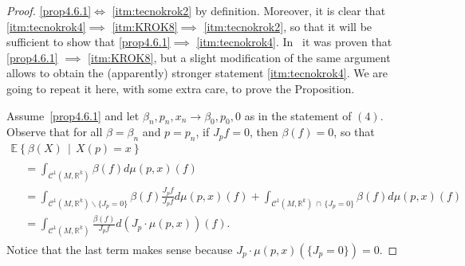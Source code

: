 \documentclass[AHL, Unicode, longabstracts, published]{cedram}
\newcommand{\R}{\mathbb{R}}
\newcommand{\EE}{\mathbb{E}}
\newcommand{\mC}{\mathcal{C}}
\begin{document}
\begin{proof}
\eqref{prop4.6.1}$\iff$ \eqref{itm:tecnokrok2} by definition. Moreover, it is clear that \eqref{itm:tecnokrok4}$\implies$ \eqref{itm:KROK8}$\implies$ \eqref{itm:tecnokrok2}, so that it will be sufficient to show that \eqref{prop4.6.1}$\implies$ \eqref{itm:tecnokrok4}. In~\cite[Proposition~2.4]{KRStec} it was proven that \eqref{prop4.6.1} $\implies$ \eqref{itm:KROK8}, but a slight modification of the same argument allows to obtain the (apparently) stronger statement \eqref{itm:tecnokrok4}. We are going to repeat it here, with some extra care, to prove the Proposition.

Assume~\eqref{prop4.6.1} and let $\beta_n,p_n,x_n\to \beta_0,p_0,0$ as in the statement of $(4)$. Observe that for all $\beta=\beta_n$ and $p=p_n$, if $J_{p}f=0$, then $\beta(f)=0$, so that
\begin{multline*}
\EE\left\{\beta(X)\,\middle|\, X(p)=x\right\}\\
\begin{aligned}
&=
\int_{\mC^1(M,\R^k)}\beta(f)d\mu(p,x) (f)\\
&=
\int_{\mC^1(M,\R^k)\smallsetminus \{J_p=0\}}\beta(f)\frac{J_pf}{J_pf}d\mu(p,x) (f) +
\int_{\mC^1(M,\R^k)\,\cap\,\{J_p=0\}}\beta(f)d\mu(p,x) (f)
\\
&=
\int_{\mC^1(M,\R^k)}\frac{\beta(f)}{J_pf}d\left( J_p\cdot \mu(p,x)\right) (f).
\end{aligned}
\end{multline*}
Notice that the last term makes sense because $J_p\cdot \mu(p,x)(\{J_p=0\})=0$.


\end{proof}
\end{document}
